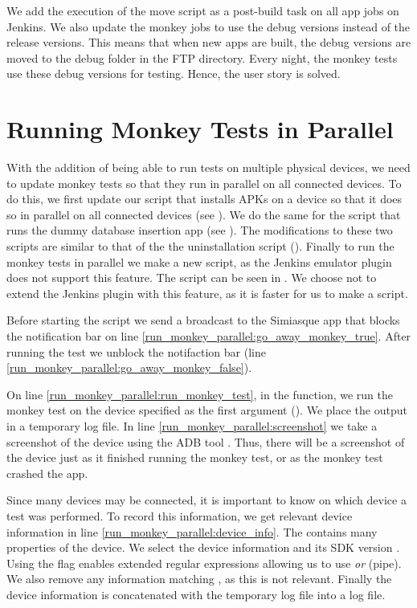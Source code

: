 We add the execution of the move script as a post-build task on all app jobs on Jenkins. We also update the monkey jobs to use the debug versions instead of the release versions. This means that when new apps are built, the debug versions are moved to the debug folder in the FTP directory. Every night, the monkey tests use these debug versions for testing. Hence, the user story is solved.

\section{Running Monkey Tests in Parallel}\label{sec:monkey_in_parallel}
With the addition of being able to run tests on multiple physical devices, we need to update monkey tests so that they run in parallel on all connected devices. To do this, we first update our script that installs APKs on a device so that it does so in parallel on all connected devices (see ). We do the same for the script that runs the dummy database insertion app (see ). The modifications to these two scripts are similar to that of the the uninstallation script (). Finally to run the monkey tests in parallel we make a new script, as the Jenkins emulator plugin does not support this feature. The script can be seen in . We choose not to extend the Jenkins plugin with this feature, as it is faster for us to make a script.

Before starting the script we send a broadcast to the Simiasque app that blocks the notification bar on line \ref{run_monkey_parallel:go_away_monkey_true}. After running the test we unblock the notifaction bar (line \ref{run_monkey_parallel:go_away_monkey_false}).

On line \ref{run_monkey_parallel:run_monkey_test}, in the  function, we run the monkey test on the device specified as the first argument (). We place the output in a temporary log file. In line \ref{run_monkey_parallel:screenshot} we take a screenshot of the device using the ADB tool \parencite{stackoverflow-adb-screencap2014}. Thus, there will be a screenshot of the device just as it finished running the monkey test, or as the monkey test crashed the app. 

Since many devices may be connected, it is important to know on which device a test was performed. To record this information, we get relevant device information in line \ref{run_monkey_parallel:device_info}. The  contains many properties of the device. We select the device information and its SDK version . Using the  flag enables extended regular expressions allowing us to use \emph{or} (pipe). We also remove any information matching , as this is not relevant. Finally the device information is concatenated with the temporary log file into a log file.

